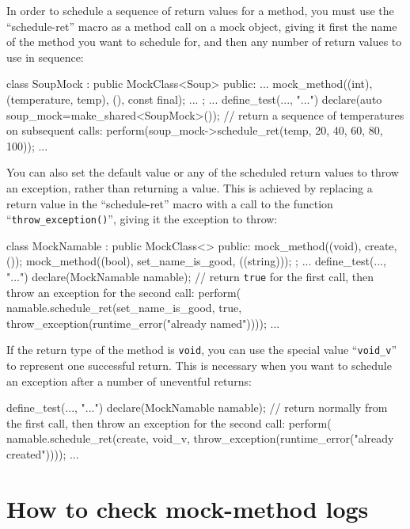\documentclass[twoside, a4paper, article]{memoir}
\begin{document}
In order to schedule a sequence of return values for a method, you must use the
``schedule-ret'' macro as a method call on a mock object, giving it first the
name of the method you want to schedule for, and then any number of return
values to use in sequence:
\begin{cpplisting}
class SoupMock
  : public MockClass<Soup> {
public:
  ...
  mock_method((int), (temperature, temp), (), const final);
  ...
};
...
define_test(..., "...") {
  declare(auto soup_mock=make_shared<SoupMock>());
  // return a sequence of temperatures on subsequent calls:
  perform(soup_mock->schedule_ret(temp,
                                  20, 40, 60, 80, 100));
  ...
}
\end{cpplisting}

You can also set the default value or any of the scheduled return values to
throw an exception, rather than returning a value.  This is achieved by
replacing a return value in the ``schedule-ret'' macro with a call to the
function ``\texttt{throw\_exception()}'', giving it the exception to throw:
\begin{cpplisting}
class MockNamable
  : public MockClass<> {
public:
  mock_method((void), create, ());
  mock_method((bool), set_name_is_good, ((string)));
};
...
define_test(..., "...") {
  declare(MockNamable namable);
  // return \texttt{true} for the first call, then throw an exception for the %
     second call:
  perform(
    namable.schedule_ret(set_name_is_good,
      true,
      throw_exception(runtime_error("already named"))));
  ...
}
\end{cpplisting}

If the return type of the method is \texttt{void}, you can use the special
value ``\texttt{void\_v}'' to represent one successful return.  This is
necessary when you want to schedule an exception after a number of uneventful
returns:
\begin{cpplisting}
define_test(..., "...") {
  declare(MockNamable namable);
  // return normally from the first call, then throw an exception for the %
     second call:
  perform(
    namable.schedule_ret(create,
      void_v,
      throw_exception(runtime_error("already created"))));
  ...
}

\end{cpplisting}

\section{How to check mock-method logs}
\label{sec:check-mock-method-logs}
\end{document}
